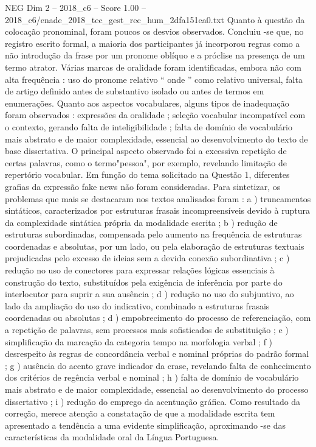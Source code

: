 \begin{textsample}{NEG Dim 2 – 2018\_c6 – Score 1.00 – 2018\_c6/enade\_2018\_tec\_gest\_rec\_hum\_2dfa151ea0.txt}
Quanto à questão da colocação pronominal, foram poucos os desvios observados.
Concluiu -se que, no registro escrito formal, a maioria dos participantes já incorporou regras como a não introdução da frase por um pronome oblíquo e a próclise na presença de um termo atrator.
Várias marcas de oralidade foram identificadas, embora não com alta frequência : uso do pronome relativo “ onde ” como relativo universal, falta de artigo definido antes de substantivo isolado ou antes de termos em enumerações.
Quanto aos aspectos vocabulares, alguns tipos de inadequação foram observados : expressões da oralidade ; seleção vocabular incompatível com o contexto, gerando falta de inteligibilidade ; falta de domínio de vocabulário mais abstrato e de maior complexidade, essencial ao desenvolvimento do texto de base dissertativa.
O principal aspecto observado foi a excessiva repetição de certas palavras, como o termo"pessoa", por exemplo, revelando limitação de repertório vocabular.
Em função do tema solicitado na Questão 1, diferentes grafias da expressão fake news não foram consideradas.
Para sintetizar, os problemas que mais se destacaram nos textos analisados foram : a ) truncamentos sintáticos, caracterizados por estruturas frasais incompreensíveis devido à ruptura da complexidade sintática própria da modalidade escrita ; b ) redução de estruturas subordinadas, compensada pelo aumento na frequência de estruturas coordenadas e absolutas, por um lado, ou pela elaboração de estruturas textuais prejudicadas pelo excesso de ideias sem a devida conexão subordinativa ; c ) redução no uso de conectores para expressar relações lógicas essenciais à construção do texto, substituídos pela exigência de inferência por parte do interlocutor para suprir a sua ausência ; d ) redução no uso do subjuntivo, ao lado da ampliação do uso do indicativo, combinado a estruturas frasais coordenadas ou absolutas ; d ) empobrecimento do processo de referenciação, com a repetição de palavras, sem processos mais sofisticados de substituição ; e ) simplificação da marcação da categoria tempo na morfologia verbal ; f ) desrespeito às regras de concordância verbal e nominal próprias do padrão formal ; g ) ausência do acento grave indicador da crase, revelando falta de conhecimento dos critérios de regência verbal e nominal ; h ) falta de domínio de vocabulário mais abstrato e de maior complexidade, essencial ao desenvolvimento do processo dissertativo ; i ) redução do emprego da acentuação gráfica.
Como resultado da correção, merece atenção a constatação de que a modalidade escrita tem apresentado a tendência a uma evidente simplificação, aproximando -se das características da modalidade oral da Língua Portuguesa.

\end{textsample}
